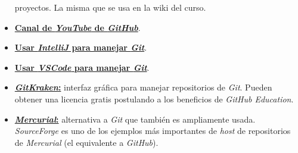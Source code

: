 \begin{itemize}
        proyectos.
        La misma que se usa en la wiki del curso. 
      \item \href{https://www.youtube.com/githubguides}{\textbf{Canal de 
        \textit{YouTube} de \textit{GitHub}}}.
      \item \href{https://www.youtube.com/watch?v=uUzRMOCBorg}{\textbf{Usar 
        \textit{IntelliJ} para manejar \textit{Git}}}.
      \item  \href{https://code.visualstudio.com/docs/editor/versioncontrol}{
        \textbf{Usar \textit{VSCode} para manejar \textit{Git}}}.
      \item \href{https://www.gitkraken.com}{\textbf{\textit{GitKraken}:}} interfaz 
        gráfica para manejar repositorios de \textit{Git}.
        Pueden obtener una licencia gratis postulando a los beneficios de 
        \textit{GitHub Education}.
      \item \href{https://www.mercurial-scm.org}{\textbf{\textit{Mercurial}:}} 
        alternativa a \textit{Git} que también es ampliamente usada.
        \textit{SourceForge} es uno de los ejemplos más importantes de \textit{host} 
        de repositorios de \textit{Mercurial} (el equivalente a \textit{GitHub}).
    \end{itemize}
%